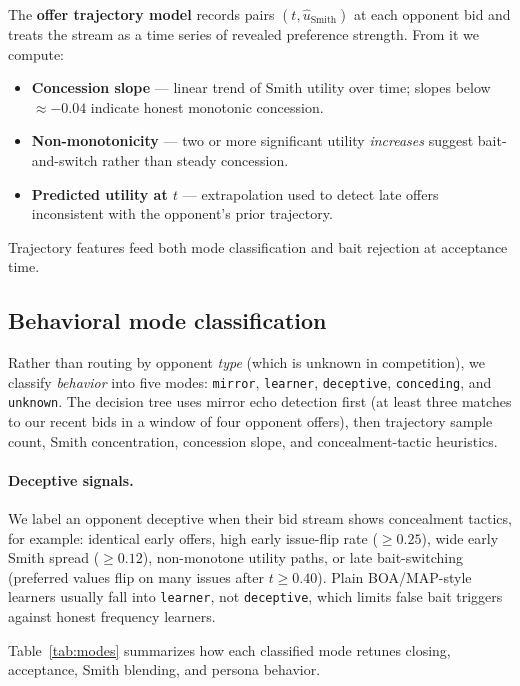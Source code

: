 \documentclass[11pt]{article}
\begin{document}
The \textbf{offer trajectory model} records pairs $(t, \hat{u}_{\text{Smith}})$ at each opponent
bid and treats the stream as a time series of revealed preference strength.
From it we compute:
\begin{itemize}
  \item \textbf{Concession slope} --- linear trend of Smith utility over time; slopes below
        ${\approx}-0.04$ indicate honest monotonic concession.
  \item \textbf{Non-monotonicity} --- two or more significant utility \emph{increases} suggest
        bait-and-switch rather than steady concession.
  \item \textbf{Predicted utility at $t$} --- extrapolation used to detect late offers
        inconsistent with the opponent's prior trajectory.
\end{itemize}
Trajectory features feed both mode classification and bait rejection at acceptance time.

\subsection{Behavioral mode classification}

Rather than routing by opponent \emph{type} (which is unknown in competition), we classify
\emph{behavior} into five modes:
\texttt{mirror}, \texttt{learner}, \texttt{deceptive}, \texttt{conceding}, and \texttt{unknown}.
The decision tree uses mirror echo detection first (at least three matches to our recent bids in
a window of four opponent offers), then trajectory sample count, Smith concentration, concession
slope, and concealment-tactic heuristics.

\paragraph{Deceptive signals.}
We label an opponent deceptive when their bid stream shows concealment tactics, for example:
identical early offers, high early issue-flip rate (${\ge}0.25$), wide early Smith spread
(${\ge}0.12$), non-monotone utility paths, or late bait-switching (preferred values flip on
many issues after $t \ge 0.40$).
Plain BOA/MAP-style learners usually fall into \texttt{learner}, not \texttt{deceptive}, which
limits false bait triggers against honest frequency learners.

Table~\ref{tab:modes} summarizes how each classified mode retunes closing, acceptance, Smith
blending, and persona behavior.
\end{document}
